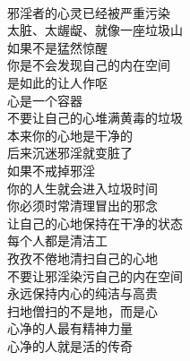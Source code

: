 \begin{poem}[清理内在空间]
    \begin{multicols}{2}
        \begin{center}~\\
            邪淫者的心灵已经被严重污染 \\ 太脏、太龌龊、就像一座垃圾山 \\ 如果不是猛然惊醒 \\ 你是不会发现自己的内在空间 \\ 是如此的让人作呕 \\ 心是一个容器 \\ 不要让自己的心堆满黄毒的垃圾 \\ 本来你的心地是干净的 \\ 后来沉迷邪淫就变脏了 \\ 如果不戒掉邪淫 \\ 你的人生就会进入垃圾时间 \\ 你必须时常清理冒出的邪念 \\ 让自己的心地保持在干净的状态 \\ 每个人都是清洁工 \\ 孜孜不倦地清扫自己的心地 \\ 不要让邪淫染污自己的内在空间 \\ 永远保持内心的纯洁与高贵 \\ 扫地僧扫的不是地，而是心 \\ 心净的人最有精神力量 \\ 心净的人就是活的传奇
        \end{center}
    \end{multicols}
\end{poem}


